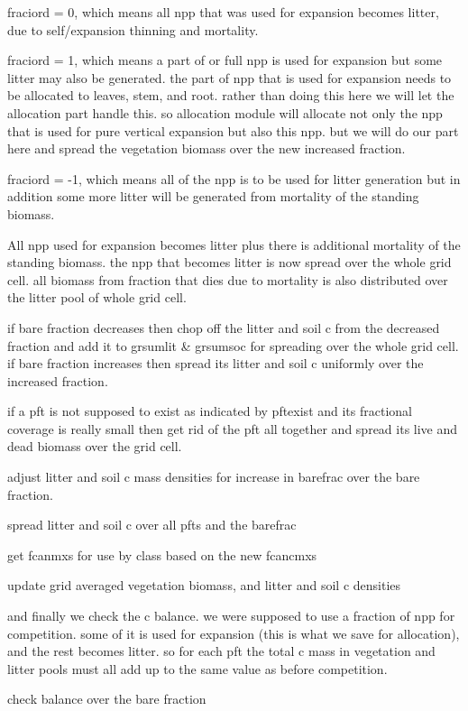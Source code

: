 \begin{DoxyEnumerate}
\item fraciord = 0, which means all npp that was used for expansion becomes litter, due to self/expansion thinning and mortality.
\item fraciord = 1, which means a part of or full npp is used for expansion but some litter may also be generated. the part of npp that is used for expansion needs to be allocated to leaves, stem, and root. rather than doing this here we will let the allocation part handle this. so allocation module will allocate not only the npp that is used for pure vertical expansion but also this npp. but we will do our part here and spread the vegetation biomass over the new increased fraction.
\item fraciord = -\/1, which means all of the npp is to be used for litter generation but in addition some more litter will be generated from mortality of the standing biomass.
\end{DoxyEnumerate}

All npp used for expansion becomes litter plus there is additional mortality of the standing biomass. the npp that becomes litter is now spread over the whole grid cell. all biomass from fraction that dies due to mortality is also distributed over the litter pool of whole grid cell.

if bare fraction decreases then chop off the litter and soil c from the decreased fraction and add it to grsumlit \& grsumsoc for spreading over the whole grid cell. if bare fraction increases then spread its litter and soil c uniformly over the increased fraction.

if a pft is not supposed to exist as indicated by pftexist and its fractional coverage is really small then get rid of the pft all together and spread its live and dead biomass over the grid cell.

adjust litter and soil c mass densities for increase in barefrac over the bare fraction.

spread litter and soil c over all pfts and the barefrac

get fcanmxs for use by class based on the new fcancmxs

update grid averaged vegetation biomass, and litter and soil c densities

and finally we check the c balance. we were supposed to use a fraction of npp for competition. some of it is used for expansion (this is what we save for allocation), and the rest becomes litter. so for each pft the total c mass in vegetation and litter pools must all add up to the same value as before competition.

check balance over the bare fraction 